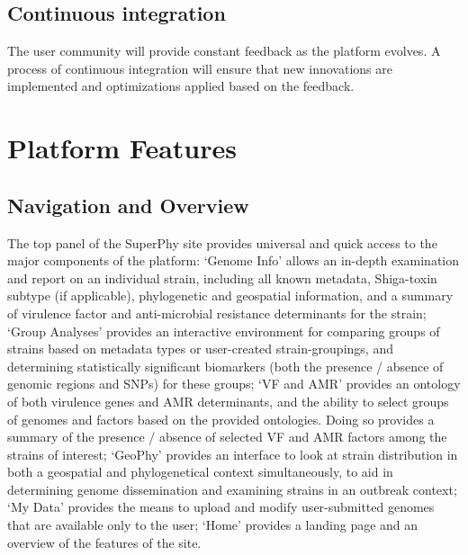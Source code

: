 \documentclass{bmcart}
\begin{document}
\subsection{Continuous integration}
The user community will provide constant feedback as the platform evolves. A process of continuous integration will ensure that new innovations are implemented and optimizations applied based on the feedback.

\section{Platform Features}
\subsection{Navigation and Overview}
The top panel of the SuperPhy site provides universal and quick access to the major components of the platform: `Genome Info'  allows an in-depth examination and report on an individual strain, including all known metadata, Shiga-toxin subtype (if applicable), phylogenetic and geospatial information, and a summary of virulence factor and anti-microbial resistance determinants for the strain; `Group Analyses' provides an interactive environment for comparing groups of strains based on metadata types or user-created strain-groupings, and determining statistically significant biomarkers (both the presence / absence of genomic regions and SNPs) for these groups; `VF and AMR' provides an ontology of both virulence genes and AMR determinants, and the ability to select groups of genomes and factors based on the provided ontologies. Doing so provides a summary of the presence / absence of selected VF and AMR factors among the strains of interest; `GeoPhy' provides an interface to look at strain distribution in both a geospatial and phylogenetical context simultaneously, to aid in determining genome dissemination and examining strains in an outbreak context; `My Data' provides the means to upload and modify user-submitted genomes that are available only to the user; `Home' provides a landing page and an overview of the features of the site. 
\end{document}
